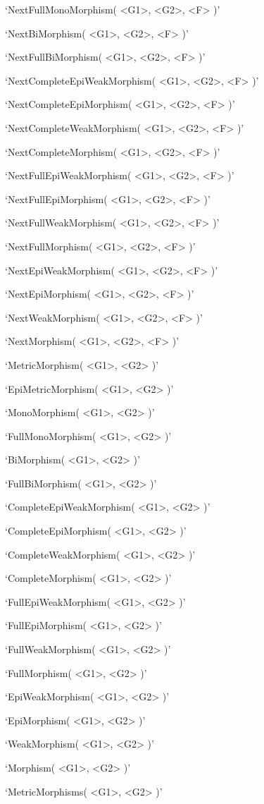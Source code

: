 `NextFullMonoMorphism( <G1>, <G2>, <F> )'

`NextBiMorphism( <G1>, <G2>, <F> )'

`NextFullBiMorphism( <G1>, <G2>, <F> )'

`NextCompleteEpiWeakMorphism( <G1>, <G2>, <F> )'

`NextCompleteEpiMorphism( <G1>, <G2>, <F> )'

`NextCompleteWeakMorphism( <G1>, <G2>, <F> )'

`NextCompleteMorphism( <G1>, <G2>, <F> )'

`NextFullEpiWeakMorphism( <G1>, <G2>, <F> )'

`NextFullEpiMorphism( <G1>, <G2>, <F> )'

`NextFullWeakMorphism( <G1>, <G2>, <F> )'

`NextFullMorphism( <G1>, <G2>, <F> )'

`NextEpiWeakMorphism( <G1>, <G2>, <F> )'

`NextEpiMorphism( <G1>, <G2>, <F> )'

`NextWeakMorphism( <G1>, <G2>, <F> )'

`NextMorphism( <G1>, <G2>, <F> )'


`MetricMorphism( <G1>, <G2> )'

`EpiMetricMorphism( <G1>, <G2> )'

`MonoMorphism( <G1>, <G2> )'

`FullMonoMorphism( <G1>, <G2> )'

`BiMorphism( <G1>, <G2> )'

`FullBiMorphism( <G1>, <G2> )'

`CompleteEpiWeakMorphism( <G1>, <G2> )'

`CompleteEpiMorphism( <G1>, <G2> )'

`CompleteWeakMorphism( <G1>, <G2> )'

`CompleteMorphism( <G1>, <G2> )'

`FullEpiWeakMorphism( <G1>, <G2> )'

`FullEpiMorphism( <G1>, <G2> )'

`FullWeakMorphism( <G1>, <G2> )'

`FullMorphism( <G1>, <G2> )'

`EpiWeakMorphism( <G1>, <G2> )'

`EpiMorphism( <G1>, <G2> )'

`WeakMorphism( <G1>, <G2> )'

`Morphism( <G1>, <G2> )'

`MetricMorphisms( <G1>, <G2> )'

